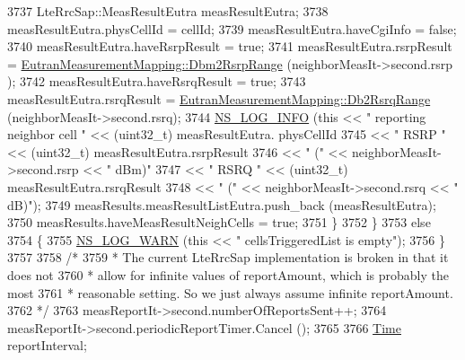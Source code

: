 \begin{DoxyCode}
3737               LteRrcSap::MeasResultEutra measResultEutra;
3738               measResultEutra.physCellId = cellId;
3739               measResultEutra.haveCgiInfo = \textcolor{keyword}{false};
3740               measResultEutra.haveRsrpResult = \textcolor{keyword}{true};
3741               measResultEutra.rsrpResult = 
      \hyperlink{classns3_1_1EutranMeasurementMapping_a2c42e6628a24280f58edf8f3814b9d54}{EutranMeasurementMapping::Dbm2RsrpRange} (neighborMeasIt->second.rsrp
      );
3742               measResultEutra.haveRsrqResult = \textcolor{keyword}{true};
3743               measResultEutra.rsrqResult = 
      \hyperlink{classns3_1_1EutranMeasurementMapping_adcd875f25361c17646c45695b9b6e8c4}{EutranMeasurementMapping::Db2RsrqRange} (neighborMeasIt->second.rsrq);
3744               \hyperlink{group__logging_gafbd73ee2cf9f26b319f49086d8e860fb}{NS\_LOG\_INFO} (\textcolor{keyword}{this} << \textcolor{stringliteral}{" reporting neighbor cell "} << (uint32\_t) measResultEutra.
      physCellId 
3745                                 << \textcolor{stringliteral}{" RSRP "} << (uint32\_t) measResultEutra.rsrpResult
3746                                 << \textcolor{stringliteral}{" ("} << neighborMeasIt->second.rsrp << \textcolor{stringliteral}{" dBm)"}
3747                                 << \textcolor{stringliteral}{" RSRQ "} << (uint32\_t) measResultEutra.rsrqResult
3748                                 << \textcolor{stringliteral}{" ("} << neighborMeasIt->second.rsrq << \textcolor{stringliteral}{" dB)"});
3749               measResults.measResultListEutra.push\_back (measResultEutra);
3750               measResults.haveMeasResultNeighCells = \textcolor{keyword}{true};
3751             \}
3752         \}
3753       \textcolor{keywordflow}{else}
3754         \{
3755           \hyperlink{group__logging_gade7208b4009cdf0e25783cd26766f559}{NS\_LOG\_WARN} (\textcolor{keyword}{this} << \textcolor{stringliteral}{" cellsTriggeredList is empty"});
3756         \}
3757 
3758       \textcolor{comment}{/*}
3759 \textcolor{comment}{       * The current LteRrcSap implementation is broken in that it does not}
3760 \textcolor{comment}{       * allow for infinite values of reportAmount, which is probably the most}
3761 \textcolor{comment}{       * reasonable setting. So we just always assume infinite reportAmount.}
3762 \textcolor{comment}{       */}
3763       measReportIt->second.numberOfReportsSent++;
3764       measReportIt->second.periodicReportTimer.Cancel ();
3765 
3766       \hyperlink{namespacens3_1_1TracedValueCallback_a7ffd3e7c142ffe7c8a1d2db9b8de38ec}{Time} reportInterval;

\end{DoxyCode}
